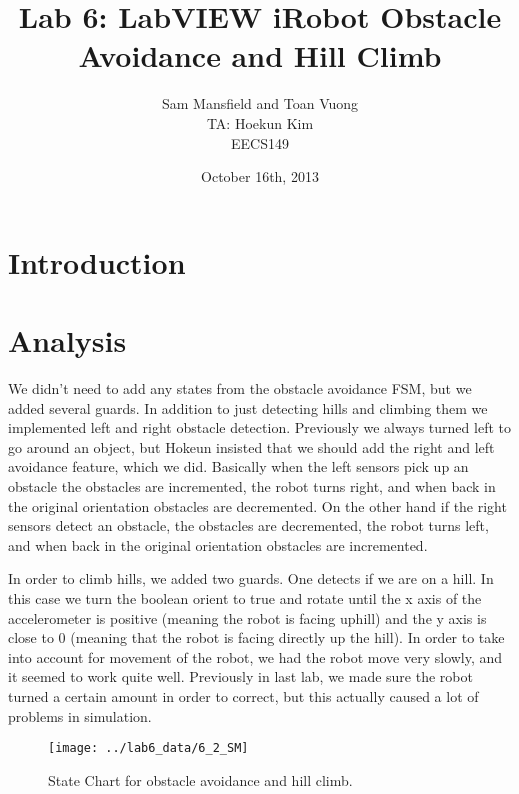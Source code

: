 \documentclass[10pt,titlepage]{article}
\begin{document}
  \title{Lab 6: LabVIEW iRobot Obstacle Avoidance and Hill Climb}
  \author{Sam Mansfield and Toan Vuong \\
          TA: Hoekun Kim \\
          EECS149}
  \date{October 16th, 2013}
  \maketitle

  \section{Introduction}

  \section{Analysis}
    
    We didn't need to add any states from the obstacle avoidance FSM, but we added several guards. In addition to just detecting hills and climbing them we implemented left and right obstacle detection. Previously we always turned left to go around an object, but Hokeun insisted that we should add the right and left avoidance feature, which we did. Basically when the left sensors pick up an obstacle the obstacles are incremented, the robot turns right, and when back in the original orientation obstacles are decremented. On the other hand if the right sensors detect an obstacle, the obstacles are decremented, the robot turns left, and when back in the original orientation obstacles are incremented. 

    In order to climb hills, we added two guards. One detects if we are on a hill. In this case we turn the boolean orient to true and rotate until the x axis of the accelerometer is positive (meaning the robot is facing uphill) and the y axis is close to 0 (meaning that the robot is facing directly up the hill). In order to take into account for movement of the robot, we had the robot move very slowly, and it seemed to work quite well. Previously in last lab, we made sure the robot turned a certain amount in order to correct, but this actually caused a lot of problems in simulation.

    \begin{figure}[h]
      \texttt{[image: ../lab6\_data/6\_2\_SM]}
      \caption{State Chart for obstacle avoidance and hill climb.}
    \end{figure}
\end{document}

